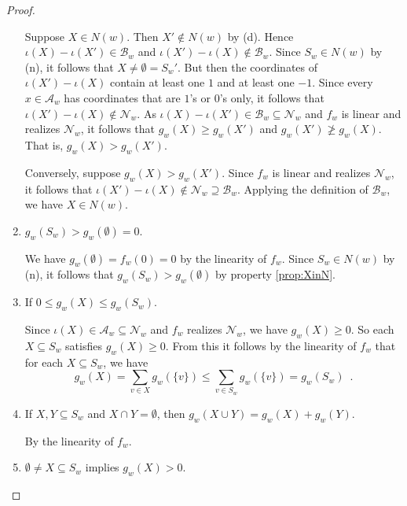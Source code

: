 \documentclass[12pt]{article}
\theoremstyle{definition}
\begin{document}
\begin{proof}
\begin{enumerate}
    Suppose $X\in N(w)$. Then $X'\notin N(w)$ by (d).  Hence
    $\iota(X)-\iota(X')\in\mathcal{B}_w$ and
    $\iota(X')-\iota(X)\notin\mathcal{B}_w$.  Since $S_w\in
    N(w)$ by (n), it follows that $X\neq\emptyset=S_w'$.  But
    then the coordinates of $\iota(X')-\iota(X)$ contain at least one
    $1$ and at least one $-1$.  Since every $x\in\mathcal{A}_w$
    has coordinates that are $1$'s or $0$'s only, it follows that
    $\iota(X')-\iota(X)\notin\mathcal{N}_w$.  As
    $\iota(X)-\iota(X')\in\mathcal{B}_w\subseteq
    \mathcal{N}_w$ and $f_w$ is linear and realizes
    $\mathcal{N}_w$, it follows that $g_w(X)\geq g_w(X')$
    and $g_w(X')\ngeq g_w(X)$.  That is,
    $g_w(X)>g_w(X')$.

    Conversely, suppose $g_w(X)>g_w(X')$. Since $f_w$ is
    linear and realizes $\mathcal{N}_w$, it follows that
    $\iota(X')-\iota(X)\notin\mathcal{N}_w\supseteq
    \mathcal{B}_w$. Applying the definition of
    $\mathcal{B}_w$, we have $X\in N(w)$.

  \item \label{prop:emptyS} $g_w(S_w)>g_w(\emptyset)=0$.

    We have $g_w(\emptyset)=f_w(0)=0$ by the linearity of
    $f_w$.  Since $S_w\in N(w)$ by (n), it follows that
    $g_w(S_w)>g_w(\emptyset)$ by property \ref{prop:XinN}.

  \item \label{prop:zerotoS} If $0\leq g_w(X)\leq
    g_w(S_w)$.
    
    Since $\iota(X)\in\mathcal{A}_w\subseteq \mathcal{N}_w$
    and $f_w$ realizes $\mathcal{N}_w$, we have
    $g_w(X)\geq 0$.  So each $X\subseteq S_w$ satisfies
    $g_w(X)\geq 0$.  From this it follows by the linearity of
    $f_w$ that for each $X\subseteq S_w$, we have
    \[
    \textstyle g_w(X)=\sum_{v\in X}g_w(\{v\}) \leq\sum_{v\in
      S_w}g_w(\{v\}) =g_w(S_w)\enspace.
    \]

  \item \label{prop:additivity} If $X,Y\subseteq S_w$ and $X\cap
    Y=\emptyset$, then $g_w(X\cup Y)=g_w(X)+g_w(Y)$.
    
    By the linearity of $f_w$.

  \item \label{prop:fullsupport} $\emptyset\neq X\subseteq S_w$
    implies $g_w(X)>0$.


\end{enumerate}
\end{proof}
\end{document}
